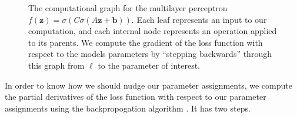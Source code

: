 \begin{figure}
	\centering

	\caption{The computational graph for the multilayer perceptron $f(\mathbf z) = \sigma(C \sigma(A\mathbf z +\mathbf b))$. Each leaf represents an input to our computation, and each internal node represents an operation applied to its parents. We compute the gradient of the loss function with respect to the models parameters by ``stepping backwards'' through this graph from $\ell$ to the parameter of interest.}
	\label{fig:mlp-computational-graph}
\end{figure}

In order to know how we should nudge our parameter assignments, we compute the partial derivatives of the loss function with respect to our parameter assignments using the backpropogation algorithm \cite[\S 13.3]{PML}. It has two steps.

